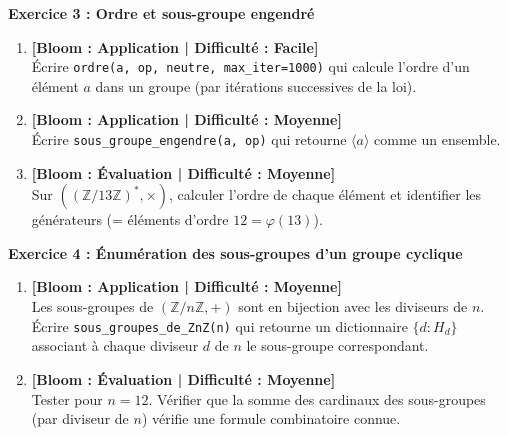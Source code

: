\documentclass[12pt,a4paper]{report}
\theoremstyle{definition}
\theoremstyle{remark}
\begin{document}
\vspace{0.3cm}

\noindent\textbf{Exercice 3 : Ordre et sous-groupe engendré}
\begin{enumerate}
    \item \textbf{[Bloom : Application | Difficulté : Facile]} \\
    Écrire \texttt{ordre(a, op, neutre, max\_iter=1000)} qui calcule l'ordre d'un élément $a$ dans un groupe (par itérations successives de la loi).
    \item \textbf{[Bloom : Application | Difficulté : Moyenne]} \\
    Écrire \texttt{sous\_groupe\_engendre(a, op)} qui retourne $\langle a \rangle$ comme un ensemble.
    \item \textbf{[Bloom : Évaluation | Difficulté : Moyenne]} \\
    Sur $((\mathbb{Z}/13\mathbb{Z})^*, \times)$, calculer l'ordre de chaque élément et identifier les générateurs (= éléments d'ordre $12 = \varphi(13)$).
\end{enumerate}

\vspace{0.3cm}

\noindent\textbf{Exercice 4 : Énumération des sous-groupes d'un groupe cyclique}
\begin{enumerate}
    \item \textbf{[Bloom : Application | Difficulté : Moyenne]} \\
    Les sous-groupes de $(\mathbb{Z}/n\mathbb{Z}, +)$ sont en bijection avec les diviseurs de $n$. Écrire \texttt{sous\_groupes\_de\_ZnZ(n)} qui retourne un dictionnaire $\{d : H_d\}$ associant à chaque diviseur $d$ de $n$ le sous-groupe correspondant.
    \item \textbf{[Bloom : Évaluation | Difficulté : Moyenne]} \\
    Tester pour $n = 12$. Vérifier que la somme des cardinaux des sous-groupes (par diviseur de $n$) vérifie une formule combinatoire connue.
\end{enumerate}

\vspace{0.3cm}
\end{document}

